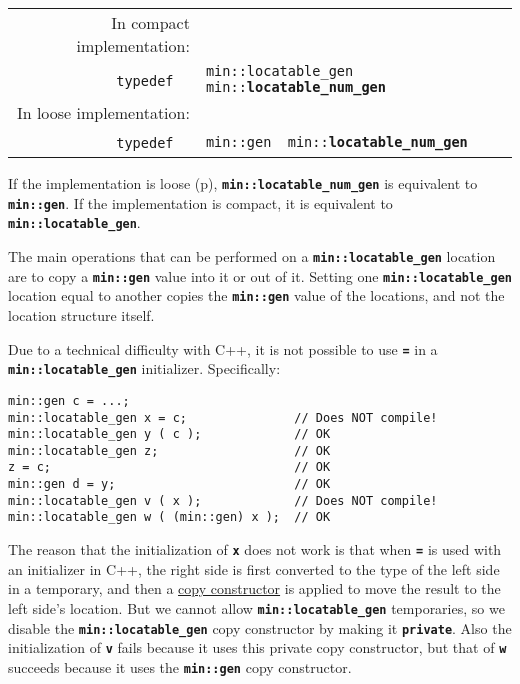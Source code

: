\documentclass[12pt]{article}
\makeatletter
\newcommand{\TT}[1]{{\tt \bfseries #1}}
\newcommand{\ttindex}[1]{\index{#1@{\tt #1}}}
\newcommand{\minindex}[1]{\ttindex{min::#1}\ttindex{#1}}
\newcommand{\pagref}[1]{p\pageref{#1}}
\newcommand{\EOL}{\penalty \exhyphenpenalty}
\newenvironment{indpar}[1][0.3in]%
	{\begin{list}{}%
		     {\setlength{\itemsep}{0in}%
		      \setlength{\topsep}{0in}%
		      \setlength{\parsep}{1ex}%
		      \setlength{\labelwidth}{#1}%
		      \setlength{\leftmargin}{#1}%
		      \addtolength{\leftmargin}{\labelsep}}%
	 \item}%
	{\end{list}}
\newcommand{\LABEL}[1]{\label{#1}}
\newcommand{\MINKEY}[1]{{\tt \bf #1}\minindex{#1}}
\makeatother
\begin{document}
\begin{indpar}[0.1in]\begin{tabular}{r@{}l}
In compact implementation: \\
~~~~\verb|typedef  |
	& \verb|min::locatable_gen  min::|\MINKEY{locatable\_num\_gen} \\
In loose implementation: \\
~~~~\verb|typedef  |
	& \verb|min::gen  min::|\MINKEY{locatable\_num\_gen}
\LABEL{MIN::LOCATABLE_NUM_GEN_TYPEDEF} \\
\end{tabular}\end{indpar}

If the implementation is loose (\pagref{LOOSE}),
\TT{min::locatable\_\EOL num\_\EOL gen} is equivalent to
\TT{min::gen}.  If the implementation is compact, it is equivalent to
\TT{min::locatable\_\EOL gen}.

The main operations that can be performed on a
\TT{min::locatable\_\EOL gen} location are to copy a \TT{min::gen}
value into it or out of it.  Setting one \TT{min::\EOL locatable\_\EOL gen}
location equal to another copies the \TT{min::gen} value of the locations,
and not the location structure itself.

Due to a technical difficulty with C++, it is not possible to use
\TT{=} in a \TT{min::\EOL locatable\_\EOL gen} initializer.
Specifically:

\begin{indpar}\begin{verbatim}
min::gen c = ...;
min::locatable_gen x = c;               // Does NOT compile!
min::locatable_gen y ( c );             // OK
min::locatable_gen z;                   // OK
z = c;                                  // OK
min::gen d = y;                         // OK
min::locatable_gen v ( x );             // Does NOT compile!
min::locatable_gen w ( (min::gen) x );  // OK
\end{verbatim}\end{indpar}

The reason that the initialization of \TT{x} does not work is that
\label{LOCATABLE-VAR-COPY-CONSTRUCTOR}
when \TT{=} is used with an initializer in C++, the right side is
first converted to the type of the left side in a temporary, and then a
\underline{copy constructor} is applied to move the result to the
left side's location.  But we cannot allow \TT{min::\EOL locatable\_\EOL gen}
temporaries, so we disable the \TT{min::\EOL locatable\_\EOL gen}
copy constructor by making it \TT{private}.  Also the initialization
of \TT{v} fails because it uses this private copy constructor,
but that of \TT{w} succeeds because it uses the \TT{min::gen} copy constructor.
\end{document}

